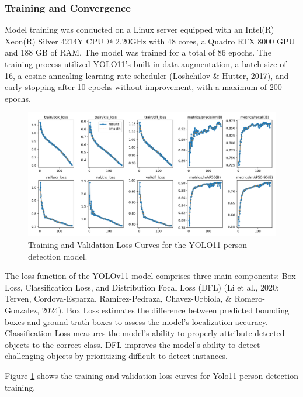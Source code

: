 \documentclass[
  man,floatsintext]{apa6}
\begin{document}
\subsubsection{Training and Convergence}\label{training-and-convergence}

Model training was conducted on a Linux server equipped with an Intel(R) Xeon(R) Silver 4214Y CPU @ 2.20GHz with 48 cores, a Quadro RTX 8000 GPU and 188 GB of RAM. The model was trained for a total of 86 epochs. The training process utilized YOLO11's built-in data augmentation, a batch size of 16, a cosine annealing learning rate scheduler (Loshchilov \& Hutter, 2017), and early stopping after 10 epochs without improvement, with a maximum of 200 epochs.

\begin{figure}

{\centering \includegraphics[width=450px]{images/yolo_face_loss_curves} 

}

\caption{Training and Validation Loss Curves for the YOLO11 person detection model.}\label{fig:person-loss-curves}
\end{figure}

The loss function of the YOLOv11 model comprises three main components: Box Loss, Classification Loss, and Distribution Focal Loss (DFL) (Li et al., 2020; Terven, Cordova-Esparza, Ramirez-Pedraza, Chavez-Urbiola, \& Romero-Gonzalez, 2024). Box Loss estimates the difference between predicted bounding boxes and ground truth boxes to assess the model's localization accuracy. Classification Loss measures the model's ability to properly attribute detected objects to the correct class. DFL improves the model's ability to detect challenging objects by prioritizing difficult-to-detect instances.

Figure \ref{fig:person-loss-curves} shows the training and validation loss curves for Yolo11 person detection training.
\end{document}
